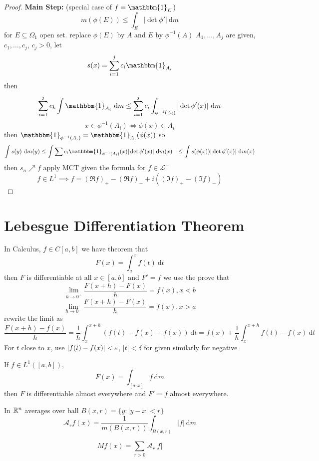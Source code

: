 \begin{proof}
  \textbf{Main Step:} (special case of $f = \mathbbm{1}_E$)
  \[m(\phi(E)) \le \int_E |\det \phi'| \ \mathrm{d}m\]
  for $E \subseteq \Omega_1$ open set.
  replace $\phi(E)$ by $A$ and $E$ by $\phi^{-1}(A)$
  $A_1, \dotsc, A_j$ are given, $c_1, \dotsc, c_j$, $c_j > 0$,
  let 
  \[s(x) = \sum_{i=1}^j c_i \mathbbm{1}_{A_i}\]
  then
  \begin{align*}
    \sum_{i=1}^j c_k \int \mathbbm{1}_{A_i} \ \mathrm{d}m \le \sum_{i=1}^j c_i \int_{\phi^{-1}(A_i)} |\det \phi'(x)| \ \mathrm{d}m
  \end{align*}
  \[x \in \phi^{-1}(A_i) \iff \phi(x) \in A_i\]
  then $\mathbbm{1}_{\phi^{-1}(A_i)} = \mathbbm{1}_{A_i} (\phi(x))$
  so
  \begin{align*}
    \int s(y) \ \mathrm{d}m(y) &\le \int \sum c_i \mathbbm{1}_{\phi^{-1}(A_i)}(x) |\det \phi'(x)| \ \mathrm{d}m(x)
    &\le \int s(\phi(x)) |\det \phi'(x)| \ \mathrm{d}m(x)
  \end{align*}
  then $s_n \nearrow f$ apply MCT given the formula for $f \in \mathcal{L}^+$
  \[f \in L^1 \implies f = (\Re f)_+ - (\Re f)_- + i((\Im f)_+ - (\Im f)_-)\]
\end{proof}

\section{Lebesgue Differentiation Theorem}

In Calculus, $f \in C[a, b]$
we have theorem that 
\[F(x) = \int_a^x f(t) \ \mathrm{d}t\]
then $F$ is differentiable at all $x \in [a, b]$ and $F' = f$
we use the prove that
\[\lim_{h \to 0^+} \frac{F(x+h) - F(x)}{h} = f(x), x < b\]
\[\lim_{h \to 0^-} \frac{F(x+h) - F(x)}{h} = f(x), x > a\]
rewrite the limit as 
\[\frac{F(x+h) - f(x)}h = \frac1h \int_x^{x+h} (f(t) - f(x) + f(x)) \ \mathrm{d}t = f(x) + \frac1h\int_x^{x+h}f(t) - f(x) \ \mathrm{d}t\]
For $t$ close to $x$, use $|f(t) - f(x)| < \varepsilon$, $|t| < \delta$ for given
similarly for negative

\begin{theorem}
  If $f \in L^1([a, b])$,
  \[F(x) = \int_{[a, x]} f \ \mathrm{d}m\]
  then $F$ is differentiable almost everywhere and $F' = f$ almost everywhere.
\end{theorem}
\begin{definition}
  In $\mathbb R^n$ averages over ball $B(x, r) = \{y : |y-x| < r\}$
  \[\mathcal{A}_r f(x) = \frac{1}{m(B(x, r))} \int_{B(x, r)} |f| \ \mathrm{d}m\]
\end{definition}
\begin{definition}
  \[Mf(x) = \sum_{r > 0} \mathcal{A}_r |f|\] 
\end{definition}

